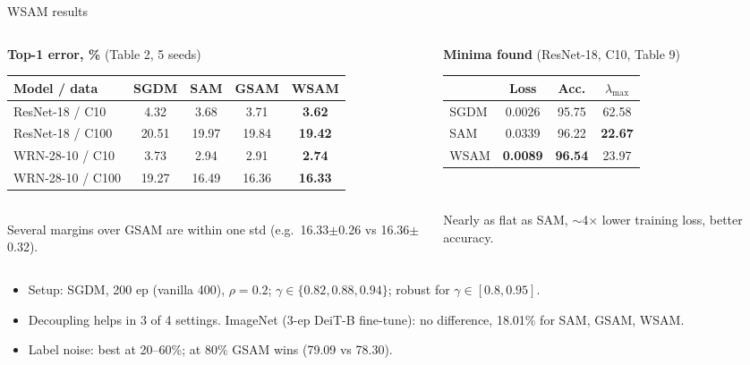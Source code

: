 \documentclass[aspectratio=169,10pt]{beamer}
\newcommand{\sh}[1]{\textcolor{sharp}{#1}}
\newcommand{\mt}[1]{\textcolor{muted}{#1}}
\newcommand{\best}[1]{\textbf{#1}}
\begin{document}
\begin{frame}{WSAM results}
\begin{columns}[T]
\begin{column}{0.55\textwidth}
\centering\small
\textbf{Top-1 error, \%} \mt{(Table 2, 5 seeds)}\\[3pt]
\begin{tabular}{@{}lcccc@{}}
\toprule
Model / data & SGDM & SAM & GSAM & WSAM\\
\midrule
ResNet-18 / C10 & 4.32 & 3.68 & 3.71 & \best{3.62}\\
ResNet-18 / C100 & 20.51 & 19.97 & 19.84 & \best{19.42}\\
WRN-28-10 / C10 & 3.73 & 2.94 & 2.91 & \best{2.74}\\
WRN-28-10 / C100 & 19.27 & 16.49 & 16.36 & \best{16.33}\\
\bottomrule
\end{tabular}\\[3pt]
{\scriptsize\mt{Several margins over GSAM are within one std (e.g.\ 16.33$\pm$0.26 vs 16.36$\pm$0.32).}}
\end{column}
\begin{column}{0.43\textwidth}
\centering\small
\textbf{Minima found} \mt{(ResNet-18, C10, Table 9)}\\[3pt]
\begin{tabular}{@{}lccc@{}}
\toprule
& Loss & Acc. & $\lambda_{\max}$\\
\midrule
SGDM & 0.0026 & 95.75 & 62.58\\
SAM & 0.0339 & 96.22 & \best{22.67}\\
WSAM & \best{0.0089} & \best{96.54} & 23.97\\
\bottomrule
\end{tabular}\\[4pt]
\raggedright\scriptsize
Nearly as flat as SAM, $\sim$4$\times$ lower training loss, better accuracy.
\end{column}
\end{columns}
\vspace{0.6em}
\begin{itemize}\small
  \item Setup: SGDM, 200 ep (vanilla 400), $\rho=0.2$; $\gamma\in\{0.82,0.88,0.94\}$; robust for $\gamma\in[0.8,0.95]$.
  \item Decoupling helps in 3 of 4 settings. \;ImageNet (3-ep DeiT-B fine-tune): \sh{no difference}, 18.01\% for SAM, GSAM, WSAM.
  \item Label noise: best at 20--60\%; at 80\% GSAM wins (79.09 vs 78.30).
\end{itemize}
\end{frame}
\end{document}
